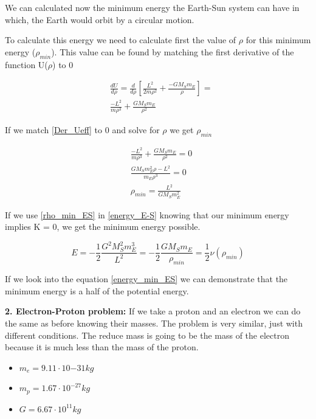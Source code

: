 We can calculated now the minimum energy the Earth-Sun system can have in which, the Earth would orbit by a circular motion. 

To calculate this energy we need to calculate first the value of $\rho$ for this minimum energy ($\rho_{min}$). This value can be found by matching the first derivative of the function U($\rho$) to 0

\begin{equation}
    \label{Der_Ueff}
    \begin{split}
    &\frac{dU}{d\rho} = \frac{d}{d\rho}\left[ \frac{L^2}{2m\rho^2}+ \frac{ - G M_S m_E}{\rho}\right]=\\
    &\frac{-L^2}{m\rho^3}+\frac{G M_S m_E}{\rho^2}
    \end{split}
\end{equation}

If we match \ref{Der_Ueff} to 0 and solve for $\rho$ we get $\rho_{min}$

\begin{equation}
    \label{rho_min_ES}
    \begin{split}
    &\frac{-L^2}{m\rho^3}+\frac{G M_S m_E}{\rho^2} = 0\\
    &\frac{G M_S m_{E}^2\rho - L^2}{m_E\rho^3} = 0\\
    &\rho_{min} = \frac{L^2}{G M_S m_{E}^2}
    \end{split}
\end{equation}

If we use \ref{rho_min_ES} in \ref{energy_E-S} knowing that our minimum energy implies K = 0, we get the minimum energy possible.

\begin{equation}
    \label{energy_min_ES}
    E = -\frac{1}{2}\frac{G^2M_{S}^2m_{E}^3}{L^2} = -\frac{1}{2}\frac{G M_S m_{E}}{\rho_{min}}=\frac{1}{2}\nu(\rho_{min})
\end{equation}

If we look into the equation \ref{energy_min_ES} we can demonstrate that the minimum energy is a half of the potential energy. 

\textbf{2. Electron-Proton problem:} If we take a proton and an electron we can do the same as before knowing their masses. The problem is very similar, just with different conditions. The reduce mass is going to be the mass of the electron because it is much less than the mass of the proton.

\begin{itemize}
    \item $m_e = 9.11 \cdot 10{-31} kg$
    \item $m_p = 1.67\cdot 10^{-27} kg$
    \item $G = 6.67 \cdot 10^{11} kg$
\end{itemize}

